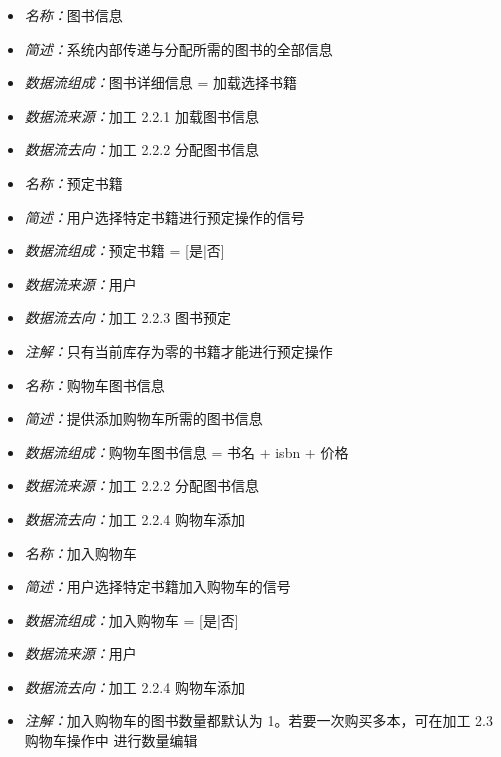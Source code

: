 \vspace{-1mm}

\begin{itemize}
	\item \textit{名称：}图书信息
	\item \textit{简述：}系统内部传递与分配所需的图书的全部信息
	\item \textit{数据流组成：}图书详细信息 = 加载选择书籍
	\item \textit{数据流来源：}加工 2.2.1 加载图书信息
	\item \textit{数据流去向：}加工 2.2.2 分配图书信息
\end{itemize}

\vspace{-1mm}

\begin{itemize}
	\item \textit{名称：}预定书籍
	\item \textit{简述：}用户选择特定书籍进行预定操作的信号
	\item \textit{数据流组成：}预定书籍 = [是|否]
	\item \textit{数据流来源：}用户
	\item \textit{数据流去向：}加工 2.2.3 图书预定
	\item \textit{注解：}只有当前库存为零的书籍才能进行预定操作
\end{itemize}

\vspace{-1mm}

\begin{itemize}
	\item \textit{名称：}购物车图书信息
	\item \textit{简述：}提供添加购物车所需的图书信息
	\item \textit{数据流组成：}购物车图书信息  = 书名 + isbn + 价格
	\item \textit{数据流来源：}加工 2.2.2 分配图书信息
	\item \textit{数据流去向：}加工 2.2.4 购物车添加
\end{itemize}

\vspace{-1mm}

\begin{itemize}
	\item \textit{名称：}加入购物车
	\item \textit{简述：}用户选择特定书籍加入购物车的信号
	\item \textit{数据流组成：}加入购物车 = [是|否]
	\item \textit{数据流来源：}用户
	\item \textit{数据流去向：}加工 2.2.4 购物车添加
	\item \textit{注解：}加入购物车的图书数量都默认为 1。若要一次购买多本，可在加工 2.3 购物车操作中	进行数量编辑
\end{itemize}

